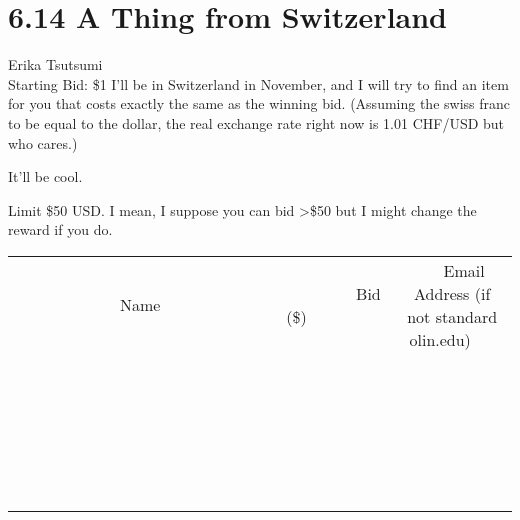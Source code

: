 \documentclass[11pt]{article}
\begin{document}
\section*{6.14 A Thing from Switzerland}
Erika Tsutsumi
\\
Starting Bid: \$1
\newline
I'll be in Switzerland in November, and I will try to find an item for you that costs exactly the same as the winning bid. (Assuming the swiss franc to be equal to the dollar, the real exchange rate right now is 1.01 CHF/USD but who cares.)

It'll be cool. 

Limit \$50 USD. I mean, I suppose you can bid \textgreater \$50 but I might change the reward if you do.
\\[6ex]
\begin{tabular}{c c c}
~~~~~~~~~~~~~Name~~~~~~~~~~~~~ & ~~~~~~~~~Bid (\$)~~~~~~~~~  & ~~~Email Address (if not standard olin.edu)~~~\\
 & & \\
\hline
 & & \\
\hline
 & & \\
\hline
 & & \\
\hline
 & & \\
\hline
 & & \\
\hline
 & & \\
\hline
 & & \\
\hline
 & & \\
\hline
 & & \\
\hline
 & & \\
\hline
 & & \\
\hline
 & & \\
\hline
 & & \\
\hline
 & & \\
\hline
 & & \\
\hline
 & & \\
\hline
 & & \\
\hline
 & & \\
\hline
 & & \\
\hline
 & & \\
\hline
 & & \\
\hline
 & & \\
\hline
 & & \\
\hline
 & & \\
\hline
 & & \\
\hline
\end{tabular}
\newpage
\end{document}
